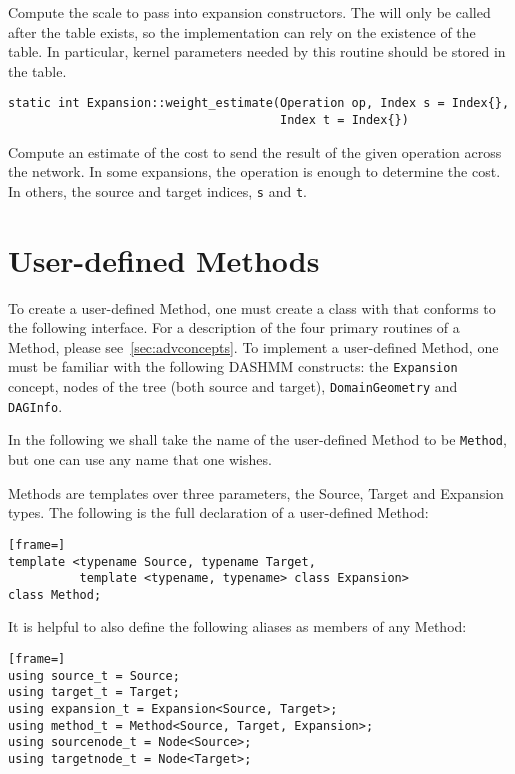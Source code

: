 \noindent Compute the scale to pass into expansion constructors. The will only
be called
after the table exists, so the implementation can rely on the existence of the
table. In particular, kernel parameters needed by this routine should be
stored in the table.

\begin{lstlisting}
static int Expansion::weight_estimate(Operation op, Index s = Index{},
                                      Index t = Index{})
\end{lstlisting}

\noindent Compute an estimate of the cost to send the result of the given
operation
across the network. In some expansions, the operation is enough to determine
the cost. In others, the source and target indices, \texttt{s} and \texttt{t}.



\section{User-defined Methods}

To create a user-defined Method, one must create a class with that conforms
to the following interface. For a description of the four primary routines
of a Method, please see~\ref{sec:advconcepts}. To implement a user-defined
Method, one must be familiar with the following DASHMM constructs: the
\texttt{Expansion} concept, nodes of the tree (both source and target),
\texttt{DomainGeometry} and \texttt{DAGInfo}.

In the following we shall take the name of the user-defined Method to be
\texttt{Method}, but one can use any name that one wishes.

Methods are templates over three parameters, the Source, Target and Expansion
types. The following is the full declaration of a user-defined Method:

\begin{lstlisting}[frame=]
template <typename Source, typename Target,
          template <typename, typename> class Expansion>
class Method;
\end{lstlisting}

\noindent It is helpful to also define the following aliases as members of
any Method:

\begin{lstlisting}[frame=]
using source_t = Source;
using target_t = Target;
using expansion_t = Expansion<Source, Target>;
using method_t = Method<Source, Target, Expansion>;
using sourcenode_t = Node<Source>;
using targetnode_t = Node<Target>;
\end{lstlisting}

